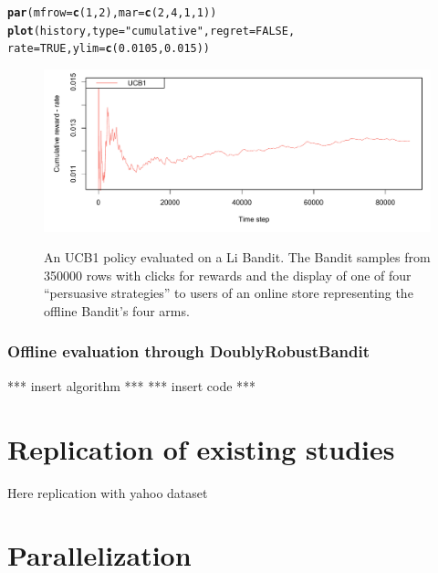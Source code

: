 \documentclass{jss}\usepackage[]{graphicx}\usepackage[]{color}
\makeatletter
\newcommand{\hlnum}[1]{\textcolor[rgb]{0.686,0.059,0.569}{#1}}%
\newcommand{\hlstr}[1]{\textcolor[rgb]{0.192,0.494,0.8}{#1}}%
\newcommand{\hlstd}[1]{\textcolor[rgb]{0.345,0.345,0.345}{#1}}%
\newcommand{\hlkwc}[1]{\textcolor[rgb]{0.333,0.667,0.333}{#1}}%
\newcommand{\hlkwd}[1]{\textcolor[rgb]{0.737,0.353,0.396}{\textbf{#1}}}%
\newenvironment{kframe}{%
 \def\at@end@of@kframe{}%
 \ifinner\ifhmode%
  \def\at@end@of@kframe{\end{minipage}}%
  \begin{minipage}{\columnwidth}%
 \fi\fi%
 \def\FrameCommand##1{\hskip\@totalleftmargin \hskip-\fboxsep
 \colorbox{shadecolor}{##1}\hskip-\fboxsep
     \hskip-\linewidth \hskip-\@totalleftmargin \hskip\columnwidth}%
 \MakeFramed {\advance\hsize-\width
   \@totalleftmargin\z@ \linewidth\hsize
   \@setminipage}}%
 {\par\unskip\endMakeFramed%
 \at@end@of@kframe}
\newenvironment{knitrout}{}{} %
\makeatother
\begin{document}
\begin{knitrout}
\begin{kframe}
\begin{alltt}
\hlkwd{par}\hlstd{(}\hlkwc{mfrow} \hlstd{=} \hlkwd{c}\hlstd{(}\hlnum{1}\hlstd{,} \hlnum{2}\hlstd{),} \hlkwc{mar} \hlstd{=} \hlkwd{c}\hlstd{(}\hlnum{2}\hlstd{,}\hlnum{4}\hlstd{,}\hlnum{1}\hlstd{,}\hlnum{1}\hlstd{))}
\hlkwd{plot}\hlstd{(history,} \hlkwc{type} \hlstd{=} \hlstr{"cumulative"}\hlstd{,} \hlkwc{regret} \hlstd{=} \hlnum{FALSE}\hlstd{,}
     \hlkwc{rate} \hlstd{=} \hlnum{TRUE}\hlstd{,} \hlkwc{ylim} \hlstd{=} \hlkwd{c}\hlstd{(}\hlnum{0.0105}\hlstd{,} \hlnum{0.015}\hlstd{))}
\end{alltt}
\end{kframe}
\end{knitrout}

\begin{figure}[H]
  \centering
    \includegraphics[width=.99\textwidth]{fig/ucb_offline}
    \label{fig:ucb_offline}
      \caption{An UCB1 policy evaluated on a Li Bandit. The Bandit samples from 350000 rows with clicks for rewards and the display of one of four “persuasive strategies” to users of an online store representing the offline Bandit's four arms.}
\end{figure}

\subsubsection{Offline evaluation through DoublyRobustBandit}

*** insert algorithm ***
*** insert code ***

\section{Replication of existing studies}

Here replication with yahoo dataset

\section{Parallelization}
\end{document}
